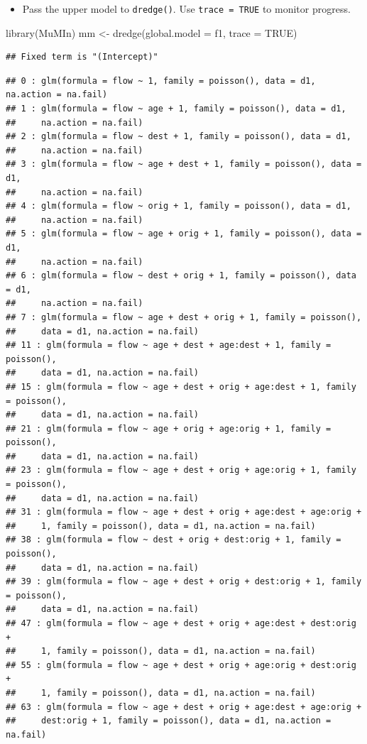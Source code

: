 \documentclass[
]{book}
\newenvironment{Shaded}{\begin{snugshade}}{\end{snugshade}}
\newcommand{\AttributeTok}[1]{\textcolor[rgb]{0.77,0.63,0.00}{#1}}
\newcommand{\ConstantTok}[1]{\textcolor[rgb]{0.00,0.00,0.00}{#1}}
\newcommand{\FunctionTok}[1]{\textcolor[rgb]{0.00,0.00,0.00}{#1}}
\newcommand{\NormalTok}[1]{#1}
\newcommand{\OtherTok}[1]{\textcolor[rgb]{0.56,0.35,0.01}{#1}}
\providecommand{\tightlist}{%
  \setlength{\itemsep}{0pt}\setlength{\parskip}{0pt}}
\begin{document}
\begin{itemize}
\tightlist
\item
  Pass the upper model to \texttt{dredge()}. Use \texttt{trace\ =\ TRUE} to monitor progress.
\end{itemize}

\begin{Shaded}
\begin{Highlighting}[]
\FunctionTok{library}\NormalTok{(MuMIn)}
\NormalTok{mm }\OtherTok{\textless{}{-}} \FunctionTok{dredge}\NormalTok{(}\AttributeTok{global.model =}\NormalTok{ f1, }\AttributeTok{trace =} \ConstantTok{TRUE}\NormalTok{)}
\end{Highlighting}
\end{Shaded}

\begin{verbatim}
## Fixed term is "(Intercept)"
\end{verbatim}

\begin{verbatim}
## 0 : glm(formula = flow ~ 1, family = poisson(), data = d1, na.action = na.fail)
## 1 : glm(formula = flow ~ age + 1, family = poisson(), data = d1, 
##     na.action = na.fail)
## 2 : glm(formula = flow ~ dest + 1, family = poisson(), data = d1, 
##     na.action = na.fail)
## 3 : glm(formula = flow ~ age + dest + 1, family = poisson(), data = d1, 
##     na.action = na.fail)
## 4 : glm(formula = flow ~ orig + 1, family = poisson(), data = d1, 
##     na.action = na.fail)
## 5 : glm(formula = flow ~ age + orig + 1, family = poisson(), data = d1, 
##     na.action = na.fail)
## 6 : glm(formula = flow ~ dest + orig + 1, family = poisson(), data = d1, 
##     na.action = na.fail)
## 7 : glm(formula = flow ~ age + dest + orig + 1, family = poisson(), 
##     data = d1, na.action = na.fail)
## 11 : glm(formula = flow ~ age + dest + age:dest + 1, family = poisson(), 
##     data = d1, na.action = na.fail)
## 15 : glm(formula = flow ~ age + dest + orig + age:dest + 1, family = poisson(), 
##     data = d1, na.action = na.fail)
## 21 : glm(formula = flow ~ age + orig + age:orig + 1, family = poisson(), 
##     data = d1, na.action = na.fail)
## 23 : glm(formula = flow ~ age + dest + orig + age:orig + 1, family = poisson(), 
##     data = d1, na.action = na.fail)
## 31 : glm(formula = flow ~ age + dest + orig + age:dest + age:orig + 
##     1, family = poisson(), data = d1, na.action = na.fail)
## 38 : glm(formula = flow ~ dest + orig + dest:orig + 1, family = poisson(), 
##     data = d1, na.action = na.fail)
## 39 : glm(formula = flow ~ age + dest + orig + dest:orig + 1, family = poisson(), 
##     data = d1, na.action = na.fail)
## 47 : glm(formula = flow ~ age + dest + orig + age:dest + dest:orig + 
##     1, family = poisson(), data = d1, na.action = na.fail)
## 55 : glm(formula = flow ~ age + dest + orig + age:orig + dest:orig + 
##     1, family = poisson(), data = d1, na.action = na.fail)
## 63 : glm(formula = flow ~ age + dest + orig + age:dest + age:orig + 
##     dest:orig + 1, family = poisson(), data = d1, na.action = na.fail)
\end{verbatim}
\end{document}
